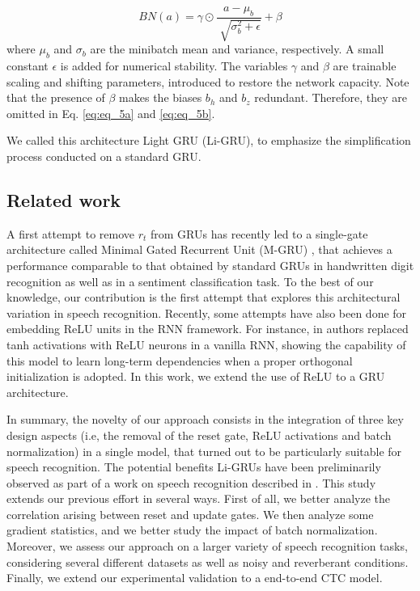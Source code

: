 \documentclass[journal]{IEEEtran}
\begin{document}
\begin{equation}
BN(a)=\gamma \odot
\label{eq:bn} \frac{a-\mu_b}{\sqrt[]{\sigma_b^2+\epsilon}}+\beta
\end{equation}
where $\mu_b$ and $\sigma_b$ are the minibatch mean and variance, respectively. A small constant $\epsilon$ is added for numerical stability. The variables $\gamma$ and $\beta$ are trainable scaling and shifting parameters, introduced to restore the network capacity. Note that the presence of $\beta$ makes the biases $b_h$ and $b_z$ redundant. Therefore, they are omitted in Eq. \ref{eq:eq_5a} and \ref{eq:eq_5b}.


We called this architecture Light GRU (Li-GRU), to emphasize the simplification process conducted on a standard GRU.


\subsection{Related work} \label{sec:related_work}
A first attempt to remove $r_{t}$ from GRUs has recently led to a single-gate architecture called Minimal Gated Recurrent Unit (M-GRU) \cite{mgru}, that achieves a performance comparable to that obtained by standard GRUs in handwritten digit recognition as well as in a sentiment classification task.  To the best of our knowledge, our contribution is the first attempt that explores this architectural variation in speech recognition.  Recently, some attempts have also been done for embedding ReLU units in the RNN framework. For instance, in \cite{orth_init} authors replaced tanh activations with ReLU neurons in a vanilla RNN, showing the capability of this model to learn long-term dependencies when a proper orthogonal initialization is adopted. In this work, we extend the use of ReLU to a GRU architecture.

In summary, the novelty of our approach consists in the integration of three key design aspects (i.e, the removal of the reset gate, ReLU activations and batch normalization) in a single model, that turned out to be particularly suitable for speech recognition. The potential benefits Li-GRUs have been preliminarily observed as part of a work on speech recognition described in \cite{ravanelli_is17}. This study extends our previous effort in several ways. First of all, we better analyze the correlation arising between reset and update gates. We then analyze some gradient statistics, and we better study the impact of batch normalization. 
Moreover, we assess our approach on a larger variety of speech recognition tasks, considering several different datasets as well as noisy and reverberant conditions. Finally, we extend our experimental validation to a end-to-end CTC model.
\end{document}
